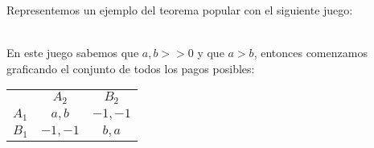 \documentclass[11pt]{article}
\begin{document}
\begin{example}
    \begin{flushleft}
        Representemos un ejemplo del teorema popular con el siguiente juego:\\
        \begin{minipage}{0.4\textwidth}
            ~\\En este juego sabemos que $a, b >> 0$ y que $a > b$, entonces comenzamos graficando el conjunto de todos los pagos posibles:\\
        \end{minipage}
        \begin{minipage}{0.5\textwidth}
            \begin{center}    
                \setlength{\extrarowheight}{0pt}
                \begin{tabular}{c|c|c|}
                    \multicolumn{1}{c}{} & \multicolumn{1}{c}{$A_2$}  & \multicolumn{1}{c}{$B_2$} \\\cline{2-3}
                    $A_1$ & $a,b$ & $-1,-1$ \\\cline{2-3}
                    $B_1$ & $-1,-1$ & $b,a$ \\\cline{2-3}
                \end{tabular}
            \end{center}
        \end{minipage}
        
    \begin{minipage}{0.5\textwidth}
\end{minipage}
\end{flushleft}
\end{example}
\end{document}
